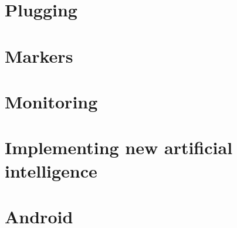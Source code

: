 \documentclass[a4paper,11pt]{report}
\begin{document}
\section{Plugging}

\section{Markers}

\section{Monitoring}

\section{Implementing new artificial intelligence}

\section{Android}
\end{document}
